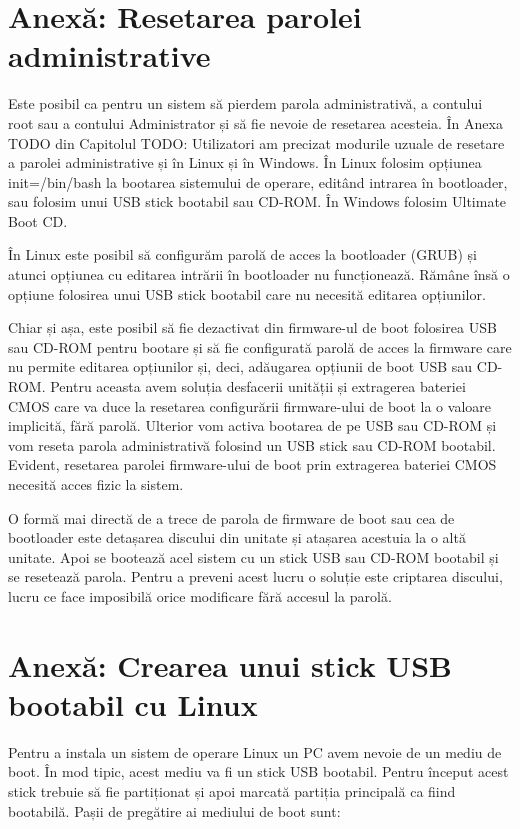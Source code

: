 \section{Anexă: Resetarea parolei administrative}
\label{sec:boot-passreset}

Este posibil ca pentru un sistem să pierdem parola administrativă, a contului
root sau a contului Administrator și să fie nevoie de resetarea acesteia. În
Anexa TODO din Capitolul TODO: Utilizatori am precizat modurile uzuale de
resetare a parolei administrative și în Linux și în Windows. În Linux folosim
opțiunea init=/bin/bash la bootarea sistemului de operare, editând intrarea în
bootloader, sau folosim unui USB stick bootabil sau CD-ROM. În Windows folosim
Ultimate Boot CD.

În Linux este posibil să configurăm parolă de acces la bootloader (GRUB) și
atunci opțiunea cu editarea intrării în bootloader nu funcționează. Rămâne însă
o opțiune folosirea unui USB stick bootabil care nu necesită editarea
opțiunilor.

Chiar și așa, este posibil să fie dezactivat din firmware-ul de boot folosirea
USB sau CD-ROM pentru bootare și să fie configurată parolă de acces la firmware
care nu permite editarea opțiunilor și, deci, adăugarea opțiunii de boot USB sau
CD-ROM. Pentru aceasta avem soluția desfacerii unității și extragerea bateriei
CMOS care va duce la resetarea configurării firmware-ului de boot la o valoare
implicită, fără parolă. Ulterior vom activa bootarea de pe USB sau CD-ROM și vom
reseta parola administrativă folosind un USB stick sau CD-ROM bootabil. Evident,
resetarea parolei firmware-ului de boot prin extragerea bateriei CMOS necesită
acces fizic la sistem.

O formă mai directă de a trece de parola de firmware de boot sau cea de
bootloader este detașarea discului din unitate și atașarea acestuia la o altă
unitate. Apoi se bootează acel sistem cu un stick USB sau CD-ROM bootabil și se
resetează parola. Pentru a preveni acest lucru o soluție este criptarea
discului, lucru ce face imposibilă orice modificare fără accesul la parolă.

\section{Anexă: Crearea unui stick USB bootabil cu Linux}
\label{sec:boot-usb}

Pentru a instala un sistem de operare Linux un PC avem nevoie de un mediu de
boot. În mod tipic, acest mediu va fi un stick USB bootabil. Pentru început
acest stick trebuie să fie partiționat și apoi marcată partiția principală ca
fiind bootabilă. Pașii de pregătire ai mediului de boot sunt:

